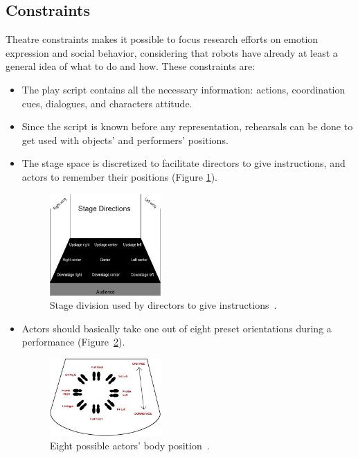 \subsection{Constraints}
Theatre constraints makes it possible to focus research efforts on emotion expression and social behavior, considering that robots have already at least a general idea of what to do and how. These constraints are: 
\begin{itemize}
	\item The play script contains all the necessary information: actions, coordination cues, dialogues, and characters attitude. 
	\item Since the script is known before any representation, rehearsals can be done to get used with objects' and performers' positions.
	\item The stage space is discretized to facilitate directors to give instructions, and actors to remember their positions (Figure \ref{fig:StageDirections}).
\begin{figure}
	\centering
	\includegraphics[width=0.4\textwidth]{Images/StageDirection.png} 
	\caption{Stage division used by directors to give instructions~\cite{Musical}.}
	\label{fig:StageDirections}
\end{figure}
	\item Actors should basically take one out of eight preset orientations during a performance (Figure~\ref{fig:BodyPosition}).   
	\begin{figure}
	\centering
	\includegraphics[width=0.4\textwidth]{Images/BodyPosition.png} 
	\caption{Eight possible actors' body position~\cite{Artopia}.}
	\label{fig:BodyPosition}
\end{figure}
\end{itemize}